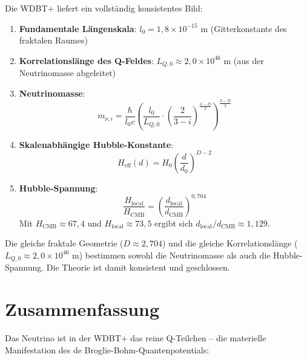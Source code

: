Die WDBT+ liefert ein vollständig konsistentes Bild:

\begin{enumerate}
    \item \textbf{Fundamentale Längenskala}: \( l_0 = 1,8 \times 10^{-15} \) m (Gitterkonstante des fraktalen Raumes)
    \item \textbf{Korrelationslänge des Q-Feldes}: \( L_{Q,0} \approx 2{,}0 \times 10^{46} \) m (aus der Neutrinomasse abgeleitet)
    \item \textbf{Neutrinomasse}:
          \[
          m_{\nu,i} = \frac{\hbar}{l_0 c} \left( \frac{l_0}{L_{Q,0}} \cdot \left(\frac{2}{3-i}\right)^{\frac{3-D}{2}} \right)^{\frac{3-D}{2}}
          \]
    \item \textbf{Skalenabhängige Hubble-Konstante}:
          \[
          H_{\text{eff}}(d) = H_0 \left( \frac{d}{d_0} \right)^{D-2}
          \]
    \item \textbf{Hubble-Spannung}:
          \[
          \frac{H_{\text{local}}}{H_{\text{CMB}}} = \left( \frac{d_{\text{local}}}{d_{\text{CMB}}} \right)^{0,704}
          \]
          Mit \( H_{\text{CMB}} \approx 67,4 \) und \( H_{\text{local}} \approx 73,5 \) ergibt sich \( d_{\text{local}}/d_{\text{CMB}} \approx 1,129 \).
\end{enumerate}

Die gleiche fraktale Geometrie (\( D \approx 2,704 \)) und die gleiche Korrelationslänge (\( L_{Q,0} \approx 2{,}0 \times 10^{46} \) m) bestimmen sowohl die Neutrinomasse als auch die Hubble-Spannung. Die Theorie ist damit konsistent und geschlossen.

\section{Zusammenfassung}
\label{app:neutrino_oszillation_zusammenfassung}

Das Neutrino ist in der WDBT+ das reine Q-Teilchen – die materielle Manifestation des de Broglie-Bohm-Quantenpotentials:

